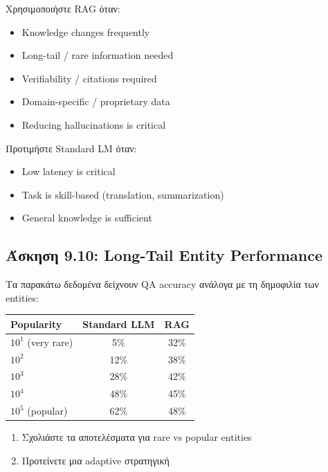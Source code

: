 \begin{infobox}
Χρησιμοποιήστε RAG όταν:
\begin{itemize}
    \item[$\checkmark$] Knowledge changes frequently
    \item[$\checkmark$] Long-tail / rare information needed
    \item[$\checkmark$] Verifiability / citations required
    \item[$\checkmark$] Domain-specific / proprietary data
    \item[$\checkmark$] Reducing hallucinations is critical
\end{itemize}
Προτιμήστε Standard LM όταν:
\begin{itemize}
    \item[$\times$] Low latency is critical
    \item[$\times$] Task is skill-based (translation, summarization)
    \item[$\times$] General knowledge is sufficient
\end{itemize}
\end{infobox}

\subsection{Άσκηση 9.10: Long-Tail Entity Performance}

\begin{formulabox}[Εκφώνηση]
Τα παρακάτω δεδομένα δείχνουν QA accuracy ανάλογα με τη δημοφιλία των entities:

\begin{center}
\begin{tabular}{lcc}
\toprule
\textbf{Popularity} & \textbf{Standard LLM} & \textbf{RAG} \\
\midrule
$10^1$ (very rare) & 5\% & 32\% \\
$10^2$ & 12\% & 38\% \\
$10^3$ & 28\% & 42\% \\
$10^4$ & 48\% & 45\% \\
$10^5$ (popular) & 62\% & 48\% \\
\bottomrule
\end{tabular}
\end{center}

\begin{enumerate}
    \item Σχολιάστε τα αποτελέσματα για rare vs popular entities
    \item Προτείνετε μια adaptive στρατηγική
\end{enumerate}
\end{formulabox}

